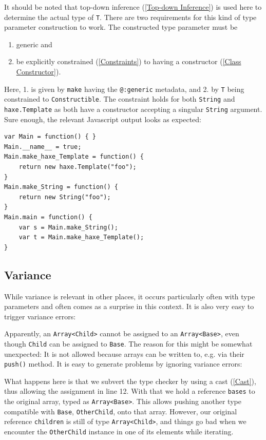 \documentclass{article}
\newcommand{\target}[1]{#1}
\newcommand{\type}[1]{\texttt{#1}}
\newcommand{\expr}[1]{\texttt{#1}}
\newcommand{\tref}[2]{#1 (\ref{#2})}
\begin{document}
 

It should be noted that \tref{top-down inference}{Top-down Inference} is used here to determine the actual type of \type{T}. There are two requirements for this kind of type parameter construction to work. The constructed type parameter must be

\begin{enumerate}
	\item generic and
	\item be explicitly \tref{constrained}{Constraints} to having a \tref{constructor}{Class Constructor}.
\end{enumerate}

Here, 1. is given by \expr{make} having the \expr{@:generic} metadata, and 2. by \type{T} being constrained to \type{Constructible}. The constraint holds for both \type{String} and \type{haxe.Template} as both have a constructor accepting a singular \type{String} argument. Sure enough, the relevant \target{Javascript} output looks as expected:

\begin{lstlisting}
var Main = function() { }
Main.__name__ = true;
Main.make_haxe_Template = function() {
	return new haxe.Template("foo");
}
Main.make_String = function() {
	return new String("foo");
}
Main.main = function() {
	var s = Main.make_String();
	var t = Main.make_haxe_Template();
}
\end{lstlisting}

\subsection{Variance}
\label{Variance}

While variance is relevant in other places, it occurs particularly often with type parameters and often comes as a surprise in this context. It is also very easy to trigger variance errors:



Apparently, an \type{Array<Child>} cannot be assigned to an \type{Array<Base>}, even though \type{Child} can be assigned to \type{Base}. The reason for this might be somewhat unexpected: It is not allowed because arrays can be written to, e.g. via their \expr{push()} method. It is easy to generate problems by ignoring variance errors:



What happens here is that we subvert the type checker by using a \tref{cast}{Cast}, thus allowing the assignment in line 12. With that we hold a reference \expr{bases} to the original array, typed as \type{Array<Base>}. This allows pushing another type compatible with \type{Base}, \type{OtherChild}, onto that array. However, our original reference \expr{children} is still of type \type{Array<Child>}, and things go bad when we encounter the \type{OtherChild} instance in one of its elements while iterating.
\end{document}
